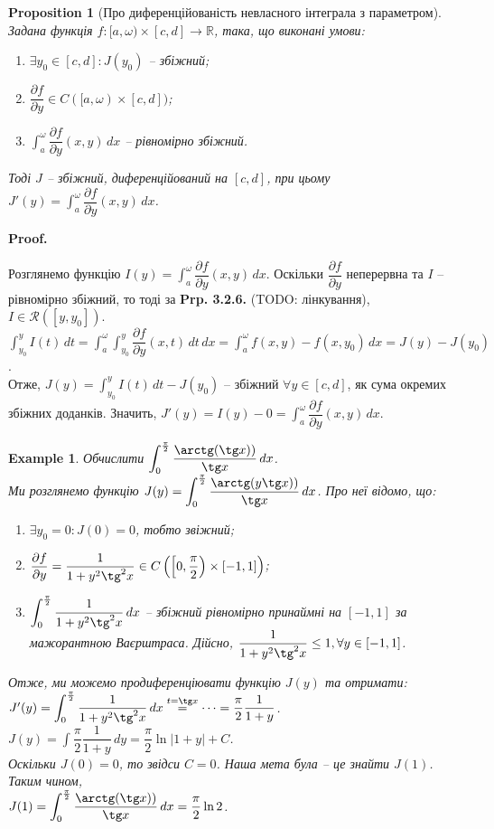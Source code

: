 \documentclass[a4paper, 10pt]{article}
\makeatletter
\def\departial#1#2{\dfrac{\partial {#1}}{\partial {#2}}}
\def\huge{\displaystyle}
\theoremstyle{theoremdd}
\theoremstyle{theoremdd}
\theoremstyle{theoremdd}
\theoremstyle{theoremdd}
\theoremstyle{theoremdd}
\newtheorem{example}[theorem]{Example}
\theoremstyle{theoremdd}
\newtheorem{proposition}[theorem]{Proposition}
\theoremstyle{theoremdd}
\theoremstyle{theoremdd}
\theoremstyle{theoremdd}
\renewenvironment{proof}[1][Proof.\\]{\par
\pushQED{\hfill \qed}%
\normalfont \topsep6\p@\@plus6\p@\relax
\trivlist
\item\relax
{\bfseries
#1\@addpunct{.}}\hspace\labelsep\ignorespaces
}{%
\popQED\endtrivlist\@endpefalse
}
\makeatother
\begin{document}
\begin{proposition}[Про диференційованість невласного інтеграла з параметром]
Задана функція $f \colon [a,\omega) \times [c,d] \to \mathbb{R}$, така, що виконані умови:
\begin{enumerate}[nosep,wide=0pt,label={\arabic*)}]
\item $\exists y_0 \in [c,d]: J(y_0)$ -- збіжний;
\item $\departial{f}{y} \in C([a,\omega) \times [c,d])$;
\item $\huge \int_a^\omega \departial{f}{y}(x,y)\,dx$ -- рівномірно збіжний.
\end{enumerate}
Тоді $J$ -- збіжний, диференційований на $[c,d]$, при цьому $J'(y) = \huge \int_a^\omega \departial{f}{y}(x,y)\,dx$.
\end{proposition}

\begin{proof}
Розглянемо функцію $I(y) = \huge \int_a^\omega \departial{f}{y}(x,y)\,dx$. Оскільки $\departial{f}{y}$ неперервна та $I$ -- рівномірно збіжний, то тоді за \textbf{Prp. 3.2.6.} (TODO: лінкування), $I \in \mathcal{R}([y,y_0])$.\\
$\huge \int_{y_0}^y I(t)\,dt = \huge \int_a^\omega \int_{y_0}^y \departial{f}{y}(x,t)\,dt\,dx = \int_a^\omega f(x,y)-f(x,y_0)\,dx = J(y) - J(y_0)$.\\
Отже, $J(y) = \huge \int_{y_0}^y I(t)\,dt - J(y_0)$ -- збіжний $\forall y \in [c,d]$, як сума окремих збіжних доданків. Значить, $J'(y) = I(y) - 0 = \huge \int_a^\omega \departial{f}{y}(x,y)\,dx$.
\end{proof}

\begin{example}
Обчислити $\huge\int_0^{\frac{\pi}{2}} \dfrac{\arctg (\tg x))}{\tg x}\,dx$.\\
Ми розглянемо функцію $J(y) = \huge\int_0^{\frac{\pi}{2}} \dfrac{\arctg (y \tg x))}{\tg x}\,dx$. Про неї відомо, що:
\begin{enumerate}[nosep,wide=0pt,label={\arabic*)}]
\item $\exists y_0 = 0: J(0) = 0$, тобто звіжний;
\item $\departial{f}{y} = \dfrac{1}{1+y^2 \tg^2 x} \in C\left( \left[ 0, \dfrac{\pi}{2} \right) \times [-1,1] \right)$;
\item $\huge\int_0^{\frac{\pi}{2}} \dfrac{1}{1+y^2 \tg^2 x}\,dx$ -- збіжний рівномірно принаймні на $[-1,1]$ за мажорантною Ваєрштраса. Дійсно, $\dfrac{1}{1+y^2 \tg^2 x} \leq 1, \forall y \in [-1,1]$.\\
\end{enumerate}
Отже, ми можемо продиференціювати функцію $J(y)$ та отримати:\\
$J'(y) = \huge\int_0^{\frac{\pi}{2}} \dfrac{1}{1+y^2 \tg^2 x}\,dx \overset{t = \tg x}{=} \dots = \dfrac{\pi}{2} \dfrac{1}{1+y}$.\\
$J(y) = \huge\int \dfrac{\pi}{2} \dfrac{1}{1+y}\,dy = \dfrac{\pi}{2} \ln |1+y| + C$.\\
Оскільки $J(0) = 0$, то звідси $C = 0$. Наша мета була -- це знайти $J(1)$. Таким чином, \\ $J(1) = \huge\int_0^{\frac{\pi}{2}} \dfrac{\arctg (\tg x))}{\tg x}\,dx = \dfrac{\pi}{2} \ln 2$.
\end{example}
\end{document}
